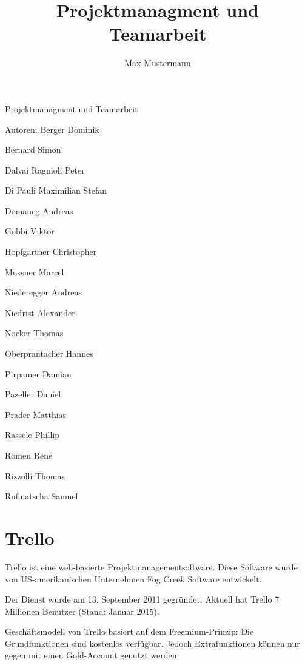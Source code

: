 \documentclass{article}
\title{Projektmanagment und Teamarbeit}
\author{Max Mustermann}
\begin{document}
\begin{center}



Projektmanagment und Teamarbeit

Autoren: Berger Dominik

Bernard Simon

Dalvai Ragnioli Peter

Di Pauli Maximilian Stefan

Domaneg Andreas

Gobbi Viktor

Hopfgartner Christopher

Mussner Marcel

Niederegger Andreas

Niedrist Alexander

Nocker Thomas

Oberprantacher Hannes

Pirpamer Damian

Pazeller Daniel

Prader Matthias

Rassele Phillip

Romen Rene

Rizzolli Thomas

Rufinatscha Samuel
\end{center}
\newpage
\tableofcontents


\section{Trello}
Trello ist eine web-basierte Projektmanagementsoftware. Diese Software wurde von US-amerikanischen Unternehmen Fog Creek Software entwickelt.

Der Dienst wurde am 13. September 2011 gegründet. Aktuell hat Trello 7 Millionen Benutzer (Stand: Januar 2015).

Geschäftsmodell von Trello basiert auf dem Freemium-Prinzip: Die Grundfunktionen sind kostenlos verfügbar. Jedoch Extrafunktionen können nur gegen mit einen Gold-Account genutzt werden.



















\end{document}
